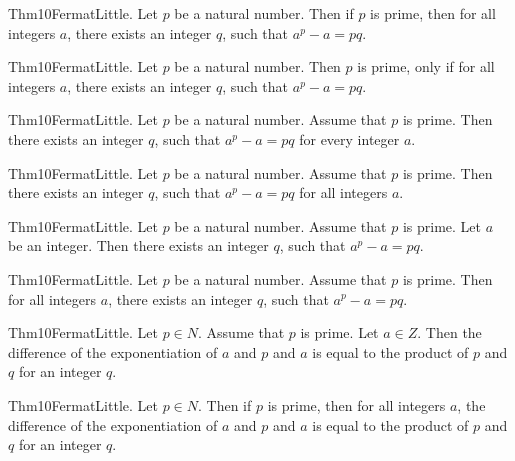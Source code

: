 \documentclass{article}
\begin{document}
Thm10FermatLittle. Let $p$ be a natural number. Then if $p$ is prime, then for all integers $a$, there exists an integer $q$, such that $a ^ {p}- a = p q$.

Thm10FermatLittle. Let $p$ be a natural number. Then $p$ is prime, only if for all integers $a$, there exists an integer $q$, such that $a ^ {p}- a = p q$.

Thm10FermatLittle. Let $p$ be a natural number. Assume that $p$ is prime. Then there exists an integer $q$, such that $a ^ {p}- a = p q$ for every integer $a$.

Thm10FermatLittle. Let $p$ be a natural number. Assume that $p$ is prime. Then there exists an integer $q$, such that $a ^ {p}- a = p q$ for all integers $a$.

Thm10FermatLittle. Let $p$ be a natural number. Assume that $p$ is prime. Let $a$ be an integer. Then there exists an integer $q$, such that $a ^ {p}- a = p q$.

Thm10FermatLittle. Let $p$ be a natural number. Assume that $p$ is prime. Then for all integers $a$, there exists an integer $q$, such that $a ^ {p}- a = p q$.

Thm10FermatLittle. Let $p \in N$. Assume that $p$ is prime. Let $a \in Z$. Then the difference of the exponentiation of $a$ and $p$ and $a$ is equal to the product of $p$ and $q$ for an integer $q$.

Thm10FermatLittle. Let $p \in N$. Then if $p$ is prime, then for all integers $a$, the difference of the exponentiation of $a$ and $p$ and $a$ is equal to the product of $p$ and $q$ for an integer $q$.
\end{document}
